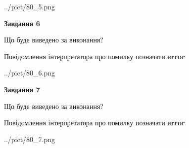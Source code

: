 \documentclass[10pt, ukrainian]{article}
\begin{document}
{\begin {large}
\begin{center}
	{../pict/80_5.png}
\end{center}
\newpage

{\begin {center}\textbf{Завдання 6}\end {center}}\par
Що буде виведено за виконання? \par
Повідомлення інтерпретатора про помилку позначати \textbf{error}

\begin{center}
	{../pict/80_6.png}
\end{center}
\newpage

{\begin {center}\textbf{Завдання 7}\end {center}}\par
Що буде виведено за виконання? \par
Повідомлення інтерпретатора про помилку позначати \textbf{error}

\begin{center}
	{../pict/80_7.png}
\end{center}
\newpage

\end {large}}
\end{document}

